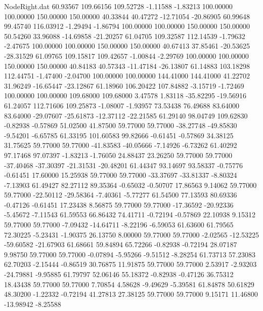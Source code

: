 \begin{filecontents}{NodeRight.dat}
  60.93567  109.66156  109.52728    -1.11588   -1.83213  100.00000  100.00000  150.00000  150.00000   40.33844   40.47272  -12.71054  -20.86905
  60.99648   99.45740  116.03912    -1.29494   -1.86794  100.00000  100.00000  150.00000  150.00000   50.54260   33.96088  -14.69858  -21.20257
  61.04705  109.32587  112.14539    -1.79632   -2.47675  100.00000  100.00000  150.00000  150.00000   40.67413   37.85461  -20.53625  -28.31529
  61.09765  109.15817  109.42657    -1.00844   -2.29769  100.00000  100.00000  150.00000  150.00000   40.84183   40.57343  -11.47184  -26.13807
  61.14883  103.18298  112.44751    -1.47400   -2.04700  100.00000  100.00000  144.41000  144.41000   41.22702   31.96249  -16.65447  -23.12867
  61.18960  106.20422  107.84882    -3.15719   -1.72469  100.00000  100.00000  109.68000  109.68000    3.47578    1.83118  -35.82295  -19.56916
  61.24057  112.71606  109.25873    -1.08007   -1.93957   73.53438   76.49688   83.64000   83.64000  -29.07607  -25.61873  -12.37112  -22.21585
  61.29140   98.04749  109.62830    -0.82938   -0.57869   51.02500   41.87500   59.77000   59.77000  -38.27748  -49.85830   -9.54201   -6.65785
  61.33195  101.60583   99.82666    -0.61451   -0.57869   34.38125   31.75625   59.77000   59.77000  -41.83583  -40.05666   -7.14926   -6.73262
  61.40292   97.17468   97.07397    -1.83213   -1.76050   24.88437   23.26250   59.77000   59.77000  -37.40468  -37.30397  -21.31531  -20.48201
  61.44347   93.14697   93.58337    -0.75776   -0.61451   17.60000   15.25938   59.77000   59.77000  -33.37697  -33.81337   -8.80324   -7.13903
  61.49427   82.27112   89.35364    -0.65032   -0.50707   17.86563    9.14062   59.77000   59.77000  -22.50112  -29.58364   -7.40361   -5.77277
  61.54500   77.13593   80.69336    -0.47126   -0.61451   17.23438    8.56875   59.77000   59.77000  -17.36592  -20.92336   -5.45672   -7.11543
  61.59553   66.86432   74.41711    -0.72194   -0.57869   22.10938    9.15312   59.77000   59.77000   -7.09432  -14.64711   -8.22196   -6.59053
  61.63600   61.79565   72.30225    -5.23431   -1.90375   26.13750    8.00000   59.77000   59.77000   -2.02565  -12.53225  -59.60582  -21.67903
  61.68661   59.84894   65.72266    -0.82938   -0.72194   28.07187    9.98750   59.77000   59.77000   -0.07894   -5.95266   -9.51512   -8.28254
  61.73713   57.23083   62.70203    -2.15444   -0.86519   30.76875   11.91875   59.77000   59.77000    2.53917   -2.93203  -24.79881   -9.95885
  61.79797   52.06146   55.18372    -0.82938   -0.47126   36.75312   18.43438   59.77000   59.77000    7.70854    4.58628   -9.49629   -5.39581
  61.84878   50.61829   48.30200    -1.22332   -0.72194   41.27813   27.38125   59.77000   59.77000    9.15171   11.46800  -13.98942   -8.25588

\end{filecontents}
